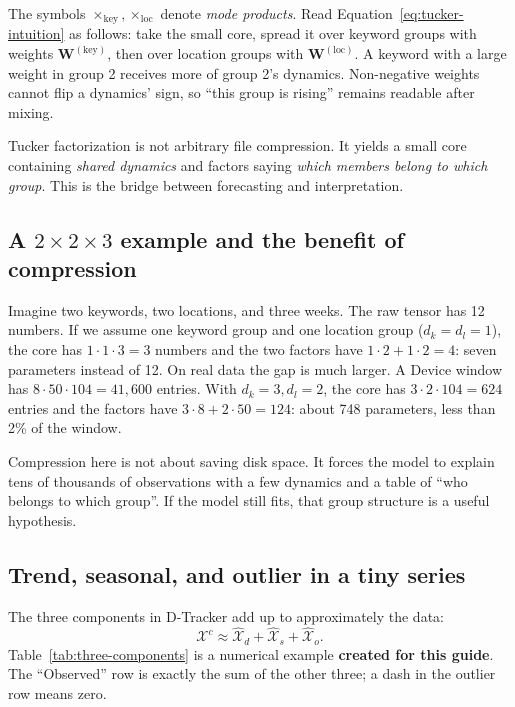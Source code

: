 The symbols $\times_{\mathrm{key}},\times_{\mathrm{loc}}$ denote \emph{mode products}. Read
Equation~\eqref{eq:tucker-intuition} as follows: take the small core, spread it over keyword groups
with weights $\mathbf{W}^{(\mathrm{key})}$, then over location groups with
$\mathbf{W}^{(\mathrm{loc})}$. A keyword with a large weight in group 2 receives more of group 2's
dynamics. Non-negative weights cannot flip a dynamics' sign, so ``this group is rising'' remains
readable after mixing.

\begin{keypoint}
Tucker factorization is not arbitrary file compression. It yields a small core containing
\emph{shared dynamics} and factors saying \emph{which members belong to which group}. This is the
bridge between forecasting and interpretation.
\end{keypoint}

\subsection{A \texorpdfstring{$2\times2\times3$}{2x2x3} example and the benefit of compression}

Imagine two keywords, two locations, and three weeks. The raw tensor has 12 numbers. If we assume one
keyword group and one location group ($d_k=d_l=1$), the core has $1\cdot1\cdot3=3$ numbers and the
two factors have $1\cdot2+1\cdot2=4$: seven parameters instead of 12. On real data the gap is much
larger. A Device window has $8\cdot50\cdot104=41{,}600$ entries. With $d_k=3,d_l=2$, the core has
$3\cdot2\cdot104=624$ entries and the factors have $3\cdot8+2\cdot50=124$: about 748 parameters,
less than 2\% of the window.

\begin{plainwords}
Compression here is not about saving disk space. It forces the model to explain tens of thousands of
observations with a few dynamics and a table of ``who belongs to which group''. If the model still
fits, that group structure is a useful hypothesis.
\end{plainwords}

\subsection{Trend, seasonal, and outlier in a tiny series}

The three components in D-Tracker add up to approximately the data:
\begin{equation}
  \mathcal{X}^{c}\approx\widehat{\mathcal{X}}_d
  +\widehat{\mathcal{X}}_s+\widehat{\mathcal{X}}_o.
  \label{eq:decompose-primer}
\end{equation}
Table~\ref{tab:three-components} is a numerical example \textbf{created for this guide}. The
``Observed'' row is exactly the sum of the other three; a dash in the outlier row means zero.

